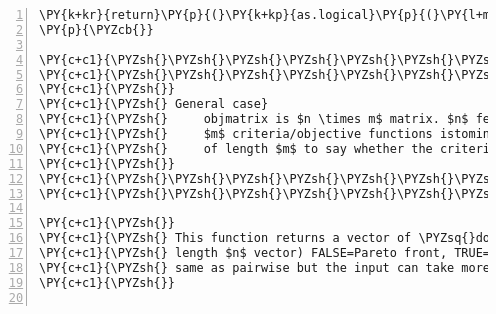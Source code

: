 \begin{Verbatim}[commandchars=\\\{\},codes={\catcode`\$=3\catcode`\^=7\catcode`\_=8},gobble=0,numbers=left,fontfamily=fvm,fontshape=n,fontsize=\footnotesize,tabsize=2]
	\PY{k+kr}{return}\PY{p}{(}\PY{k+kp}{as.logical}\PY{p}{(}\PY{l+m}{.}C\PY{p}{(}\PY{l+s}{\PYZdq{}}\PY{l+s}{domfeat\PYZdq{}}\PY{p}{,}n\PY{p}{,}obj1\PY{p}{,}obj2\PY{p}{,}domvec\PY{p}{)}\PY{p}{[[}\PY{l+m}{4}\PY{p}{]]}\PY{p}{)}\PY{p}{)}
\PY{p}{\PYZcb{}}
	
\PY{c+c1}{\PYZsh{}\PYZsh{}\PYZsh{}\PYZsh{}\PYZsh{}\PYZsh{}\PYZsh{}\PYZsh{}\PYZsh{}\PYZsh{}\PYZsh{}\PYZsh{}\PYZsh{}\PYZsh{}\PYZsh{}\PYZsh{}\PYZsh{}\PYZsh{}\PYZsh{}\PYZsh{}\PYZsh{}\PYZsh{}\PYZsh{}\PYZsh{}\PYZsh{}\PYZsh{}\PYZsh{}\PYZsh{}\PYZsh{}\PYZsh{}\PYZsh{}\PYZsh{}\PYZsh{}\PYZsh{}\PYZsh{}\PYZsh{}\PYZsh{}\PYZsh{}\PYZsh{}\PYZsh{}\PYZsh{}\PYZsh{}}
\PY{c+c1}{\PYZsh{}\PYZsh{}\PYZsh{}\PYZsh{}\PYZsh{}\PYZsh{}\PYZsh{}\PYZsh{}\PYZsh{}\PYZsh{}\PYZsh{}\PYZsh{}\PYZsh{}\PYZsh{}\PYZsh{}\PYZsh{}\PYZsh{}\PYZsh{}\PYZsh{}\PYZsh{}\PYZsh{}\PYZsh{}\PYZsh{}\PYZsh{}\PYZsh{}\PYZsh{}\PYZsh{}\PYZsh{}\PYZsh{}\PYZsh{}\PYZsh{}\PYZsh{}\PYZsh{}\PYZsh{}\PYZsh{}\PYZsh{}\PYZsh{}\PYZsh{}\PYZsh{}\PYZsh{}\PYZsh{}\PYZsh{}}
\PY{c+c1}{\PYZsh{}}
\PY{c+c1}{\PYZsh{} General case}
\PY{c+c1}{\PYZsh{}     objmatrix is $n \times m$ matrix. $n$ features/observations and }
\PY{c+c1}{\PYZsh{}     $m$ criteria/objective functions istominvec is a boolean vec}
\PY{c+c1}{\PYZsh{}     of length $m$ to say whether the criteria are to be minimised}
\PY{c+c1}{\PYZsh{}}
\PY{c+c1}{\PYZsh{}\PYZsh{}\PYZsh{}\PYZsh{}\PYZsh{}\PYZsh{}\PYZsh{}\PYZsh{}\PYZsh{}\PYZsh{}\PYZsh{}\PYZsh{}\PYZsh{}\PYZsh{}\PYZsh{}\PYZsh{}\PYZsh{}\PYZsh{}\PYZsh{}\PYZsh{}\PYZsh{}\PYZsh{}\PYZsh{}\PYZsh{}\PYZsh{}\PYZsh{}\PYZsh{}\PYZsh{}\PYZsh{}\PYZsh{}\PYZsh{}\PYZsh{}\PYZsh{}\PYZsh{}\PYZsh{}\PYZsh{}\PYZsh{}\PYZsh{}\PYZsh{}\PYZsh{}\PYZsh{}\PYZsh{}}
\PY{c+c1}{\PYZsh{}\PYZsh{}\PYZsh{}\PYZsh{}\PYZsh{}\PYZsh{}\PYZsh{}\PYZsh{}\PYZsh{}\PYZsh{}\PYZsh{}\PYZsh{}\PYZsh{}\PYZsh{}\PYZsh{}\PYZsh{}\PYZsh{}\PYZsh{}\PYZsh{}\PYZsh{}\PYZsh{}\PYZsh{}\PYZsh{}\PYZsh{}\PYZsh{}\PYZsh{}\PYZsh{}\PYZsh{}\PYZsh{}\PYZsh{}\PYZsh{}\PYZsh{}\PYZsh{}\PYZsh{}\PYZsh{}\PYZsh{}\PYZsh{}\PYZsh{}\PYZsh{}\PYZsh{}\PYZsh{}\PYZsh{}}

\PY{c+c1}{\PYZsh{}}
\PY{c+c1}{\PYZsh{} This function returns a vector of \PYZsq{}dominated\PYZsq{} observations (Boolean,}
\PY{c+c1}{\PYZsh{} length $n$ vector) FALSE=Pareto front, TRUE=dominated observation}
\PY{c+c1}{\PYZsh{} same as pairwise but the input can take more than two objective functions}
\PY{c+c1}{\PYZsh{}}


\end{Verbatim}
